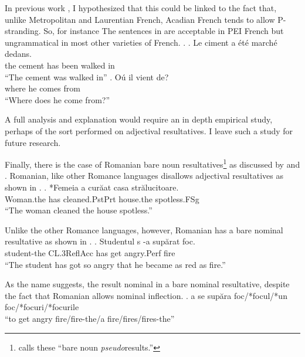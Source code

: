 \documentclass[MilwayThesis]{subfiles}
\begin{document}
In previous work \parencite{milway2015generals}, I hypothesized that this could be linked to the fact that, unlike Metropolitan and Laurentian French, Acadian French tends to allow P-stranding.
So, for instance The sentences in \Next are acceptable in PEI French but ungrammatical in most other varieties of French.
\ex.
\ag. Le ciment a \'{e}t\'{e} march\'{e} dedans.\\
the cement has been walked in\\
``The cement was walked in''
\bg. O\'{u} il vient de?\\
where he comes from\\
``Where does he come from?'' \parencite{roberge2013preposition}

A full analysis and explanation would require an in depth empirical study, perhaps of the sort \textcite{snyder1995language} performed on adjectival resultatives.
I leave such a study for future research.



Finally, there is the case of Romanian bare noun resultatives\footnote{\textcite{irimia2012secondary} calls these ``bare noun \textit{pseudo}results.''} as discussed by \textcite[220--224]{irimia2012secondary} and \textcite{farkas2011predicative}.
Romanian, like other Romance languages disallows adjectival resultatives as shown in \Next.
\exg. *Femeia a cur\u{a}at casa str\u{a}lucitoare.\footnotemark\\
Woman.the has cleaned.PstPrt house.the spotless.FSg\\
``The woman cleaned the house spotless.''\parencite{irimia2012secondary}

Unlike the other Romance languages, however, Romanian has a bare nominal resultative as shown in \Next.
\exg. Studentul s -a sup\u{a}rat foc.\\
student-the CL.3ReflAcc has get angry.Perf fire\\
``The student has got so angry that he became as red as fire.''\parencite{farkas2011predicative}

As the name suggests, the result nominal in a bare nominal resultative, despite the fact that Romanian allows nominal inflection.
\ex. a se sup\u{a}ra foc/*focul/*un foc/*focuri/*focurile\\
``to get angry fire/fire-the/a fire/fires/fires-the'' \parencite{farkas2011predicative}
\end{document}
